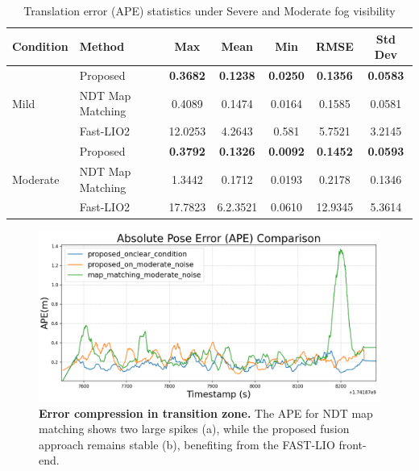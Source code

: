 \begin{table}[H]
	\centering
	\caption{Translation error (APE) statistics under Severe and Moderate  fog visibility}
	\label{tab:ape_fog_translation}
	\begin{tabular}{l l c c c c c}
		\toprule
		\textbf{Condition} & \textbf{Method} & \textbf{Max} & \textbf{Mean} & \textbf{Min} & \textbf{RMSE} & \textbf{Std Dev} \\
		\midrule
		
		\multirow{3}{*}{Mild} 
		& Proposed     & \textbf{0.3682} &\textbf{ 0.1238} &\textbf{ 0.0250} & \textbf{0.1356} & \textbf{0.0583} \\
		& NDT  Map Matching         & 0.4089 & 0.1474 & 0.0164 & 0.1585 & 0.0581 \\
		& Fast-LIO2     & 12.0253 & 4.2643 & 0.581 & 5.7521 & 3.2145 \\
		
		\midrule
		
		\multirow{3}{*}{Moderate} 
		& Proposed     & \textbf{0.3792 }& \textbf{0.1326} &\textbf{ 0.0092} & \textbf{0.1452} & \textbf{0.0593} \\
		& NDT Map Matching         & 1.3442 & 0.1712 & 0.0193 & 0.2178 & 0.1346 \\
		& Fast-LIO2     & 17.7823 & 6.2.3521 & 0.0610 & 12.9345 & 5.3614 \\
		
		\bottomrule
	\end{tabular}
\end{table}
\begin{figure}[H]
	\centering
	\includegraphics[width=\linewidth]{images/modera_noise_coma.png}
	\caption[Error comparison in transition zone]{
		\textbf{Error compression in transition zone.} The APE for NDT map matching shows two large spikes (a), while the proposed fusion approach remains stable (b), benefiting from the FAST-LIO front-end.}
	\label{fig:ape-error-unmapped}
\end{figure}

